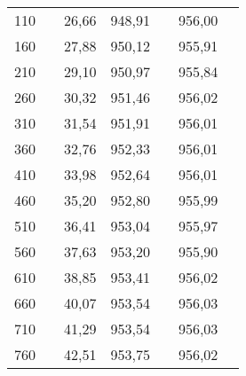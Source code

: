 \documentclass[a4paper,12pt]{report}
\begin{document}
\begin{table}[H]
\begin{tabular}{|c|c|c|c|c|c|c|}
110    &                      & 26,66 & 948,91 &                        & 956,00  &                        \\ \cline{1-1} \cline{3-4} \cline{6-6}
160    &                      & 27,88 & 950,12 &                        & 955,91  &                        \\ \cline{1-1} \cline{3-4} \cline{6-6}
210    &                      & 29,10 & 950,97 &                        & 955,84  &                        \\ \cline{1-1} \cline{3-4} \cline{6-6}
260    &                      & 30,32 & 951,46 &                        & 956,02  &                        \\ \cline{1-1} \cline{3-4} \cline{6-6}
310    &                      & 31,54 & 951,91 &                        & 956,01  &                        \\ \cline{1-1} \cline{3-4} \cline{6-6}
360    &                      & 32,76 & 952,33 &                        & 956,01  &                        \\ \cline{1-1} \cline{3-4} \cline{6-6}
410    &                      & 33,98 & 952,64 &                        & 956,01  &                        \\ \cline{1-1} \cline{3-4} \cline{6-6}
460    &                      & 35,20 & 952,80 &                        & 955,99  &                        \\ \cline{1-1} \cline{3-4} \cline{6-6}
510    &                      & 36,41 & 953,04 &                        & 955,97  &                        \\ \cline{1-1} \cline{3-4} \cline{6-6}
560    &                      & 37,63 & 953,20 &                        & 955,90  &                        \\ \cline{1-1} \cline{3-4} \cline{6-6}
610    &                      & 38,85 & 953,41 &                        & 956,02  &                        \\ \cline{1-1} \cline{3-4} \cline{6-6}
660    &                      & 40,07 & 953,54 &                        & 956,03  &                        \\ \cline{1-1} \cline{3-4} \cline{6-6}
710    &                      & 41,29 & 953,54 &                        & 956,03  &                        \\ \cline{1-1} \cline{3-4} \cline{6-6}
760    &                      & 42,51 & 953,75 &                        & 956,02  &                        \\ \cline{1-1} \cline{3-4} \cline{6-6}

\end{tabular}
\end{table}
\end{document}
